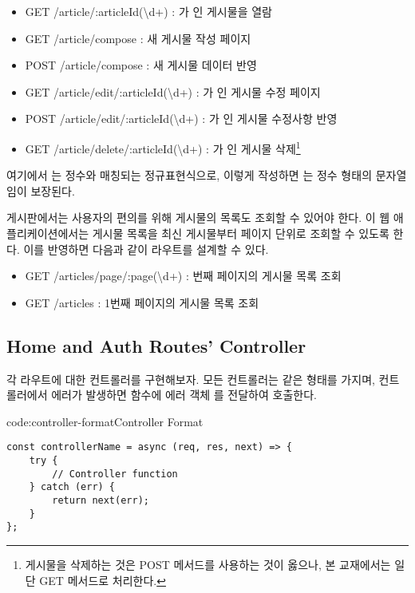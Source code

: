 \begin{itemize}
    \item GET /article/:articleId(\textbackslash{}d+) : 가 인 게시물을 열람
    \item GET /article/compose : 새 게시물 작성 페이지
    \item POST /article/compose : 새 게시물 데이터 반영
    \item GET /article/edit/:articleId(\textbackslash{}d+) : 가 인 게시물 수정 페이지
    \item POST /article/edit/:articleId(\textbackslash{}d+) : 가 인 게시물 수정사항 반영
    \item GET /article/delete/:articleId(\textbackslash{}d+) : 가 인 게시물 삭제\footnote{게시물을 삭제하는 것은 POST 메서드를 사용하는 것이 옳으나, 본 교재에서는 일단 GET 메서드로 처리한다.}
\end{itemize}

여기에서 는 정수와 매칭되는 정규표현식으로, 이렇게 작성하면 는 정수 형태의 문자열임이 보장된다.

게시판에서는 사용자의 편의를 위해 게시물의 목록도 조회할 수 있어야 한다. 이 웹 애플리케이션에서는 게시물 목록을 최신 게시물부터 페이지 단위로 조회할 수 있도록 한다. 이를 반영하면 다음과 같이 라우트를 설계할 수 있다.

\begin{itemize}
    \item GET /articles/page/:page(\textbackslash{}d+) : 번째 페이지의 게시물 목록 조회
    \item GET /articles : 1번째 페이지의 게시물 목록 조회
\end{itemize}

\subsection*{Home and Auth Routes' Controller}

각 라우트에 대한 컨트롤러를 구현해보자. 모든 컨트롤러는 \와 같은 형태를 가지며, 컨트롤러에서 에러가 발생하면  함수에 에러 객체 를 전달하여 호출한다.

\begin{code}{code:controller-format}{Controller Format}
\begin{verbatim}
const controllerName = async (req, res, next) => {
    try {
        // Controller function
    } catch (err) {
        return next(err);
    }
};
\end{verbatim}
\end{code}

